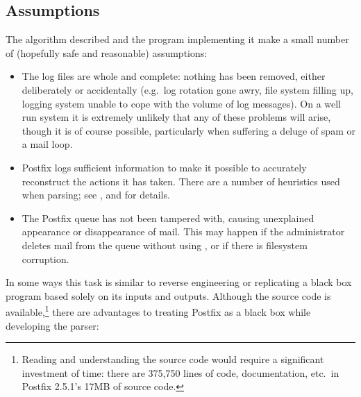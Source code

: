 \subsection{Assumptions}

The algorithm described and the program implementing it make a small number
of (hopefully safe and reasonable) assumptions:

\begin{itemize}

    \item The log files are whole and complete: nothing has been removed,
        either deliberately or accidentally (e.g.\ log rotation gone awry,
        file system filling up, logging system unable to cope with the
        volume of log messages).  On a well run system it is extremely
        unlikely that any of these problems will arise, though it is of
        course possible, particularly when suffering a deluge of spam or a
        mail loop.

    \item Postfix logs sufficient information to make it possible to
        accurately reconstruct the actions it has taken.  There are a
        number of heuristics used when parsing; see
        ,
         and  for details.

    \item The Postfix queue has not been tampered with, causing unexplained
        appearance or disappearance of mail.  This may happen if the
        administrator deletes mail from the queue without using 
        , or if there is filesystem corruption.

\end{itemize}

In some ways this task is similar to reverse engineering or replicating a
black box program based solely on its inputs and outputs.  Although the
source code is available,\footnote{Reading and understanding the source
code would require a significant investment of time: there are 375,750
lines of code, documentation, etc.\ in Postfix 2.5.1's 17MB of source code.}
there are advantages to treating Postfix as a black box while developing
the parser:

